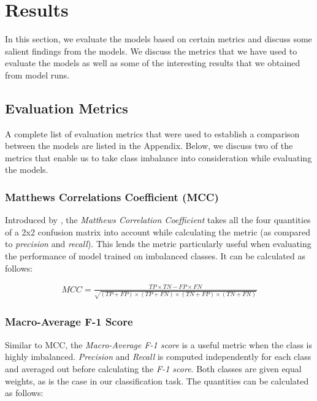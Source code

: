 \documentclass[11pt]{article}
\begin{document}

\section{Results}
\label{sec:results}
In this section, we evaluate the models based on certain metrics and discuss some salient findings from the models. We discuss the metrics that we have used to evaluate the models as well as some of the interesting results that we obtained from model runs.

\subsection{Evaluation Metrics}
A complete list of evaluation metrics that were used to establish a comparison between the models are listed in the Appendix. Below, we discuss two of the metrics that enable us to take class imbalance into consideration while evaluating the models.

\subsubsection{Matthews Correlations Coefficient (MCC)}

Introduced by , the \textit{Matthews Correlation Coefficient} takes all the four quantities of a 2x2 confusion matrix into account while calculating the metric (as compared to \textit{precision} and \textit{recall}). This lends the metric particularly useful when evaluating the performance of model trained on imbalanced classes. It can be calculated as follows:

$$
\begin{aligned}
MCC  = \frac{TP \times TN - FP \times FN}{\sqrt{(TP + FP)\times(TP + FN)\times(TN + FP)\times(TN + FN)}}
\end{aligned}
$$

\medskip

\subsubsection{Macro-Average F-1 Score}

Similar to MCC, the \textit{Macro-Average F-1 score} is a useful metric when the class is highly imbalanced. \textit{Precision} and \textit{Recall} is computed independently for each class and averaged out before calculating the \textit{F-1 score}. Both classes are given equal weights, as is the case in our classification task. The quantities can be calculated as follows:
\end{document}
